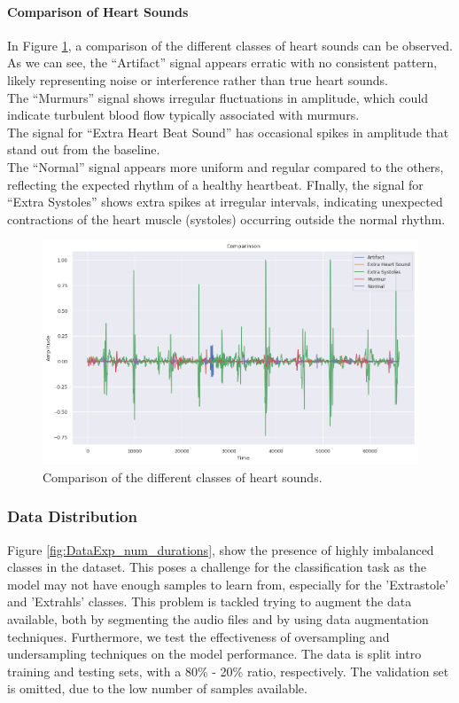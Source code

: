 \paragraph{Comparison of Heart Sounds}
In Figure \ref{fig:comparison_heart_beat_audio}, a comparison of the different classes of heart sounds can be observed.\\
As we can see, the “Artifact” signal appears erratic with no consistent pattern, likely representing noise or interference rather than true heart sounds.\\
The “Murmurs” signal shows irregular fluctuations in amplitude, which could indicate turbulent blood flow typically associated with murmurs. \\
The signal for “Extra Heart Beat Sound” has occasional spikes in amplitude that stand out from the baseline.\\
The “Normal” signal appears more uniform and regular compared to the others, reflecting the expected rhythm of a healthy heartbeat.
FInally, the signal for “Extra Systoles” shows extra spikes at irregular intervals,
indicating unexpected contractions of the heart muscle (systoles) occurring outside the normal rhythm.

\begin{figure}[H]
    \centering
    \includegraphics[width=.8\columnwidth]{../images/comparison_heart_beat_audio.png}
    \caption{Comparison of the different classes of heart sounds.}
    \label{fig:comparison_heart_beat_audio}
\end{figure}

\subsubsection*{Data Distribution} %
Figure \ref{fig:DataExp_num_durations}, show the presence of highly imbalanced classes in the dataset.
This poses a challenge for the classification task as the model may not have enough samples to learn from,
especially for the 'Extrastole' and 'Extrahls' classes. This problem is tackled trying to augment the data available,
both by segmenting the audio files and by using data augmentation techniques. Furthermore, 
we test the effectiveness of oversampling and undersampling techniques on the model performance.
The data is split intro training and testing sets, with a 80\% - 20\% ratio, respectively. The validation set
is omitted, due to the low number of samples available.

